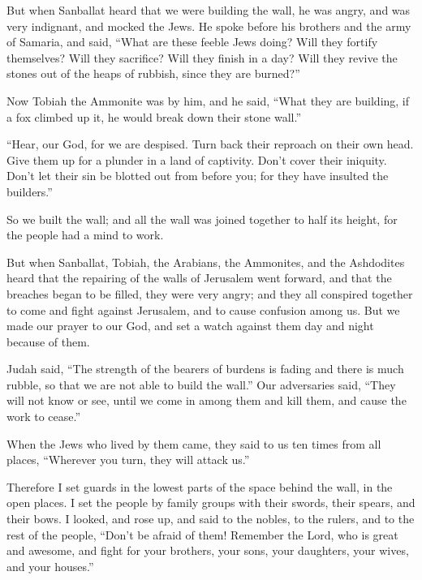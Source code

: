 \mychapter{} \myverse*{}But when Sanballat heard that we were building the wall, he was
angry, and was very indignant, and mocked the Jews.
\myverse{}He spoke before his brothers and the army of Samaria, and said, “What are these
feeble Jews doing? Will they fortify themselves? Will they sacrifice? Will they finish in a day? Will
they revive the stones out of the heaps of rubbish, since they are burned?”

\myverse{}Now Tobiah the Ammonite was by him, and he said, “What they are
building, if a fox climbed up it, he would break down their stone wall.”

\myverse{}“Hear, our God, for we are despised. Turn back their reproach on
their own head. Give them up for a plunder in a land of captivity.
\myverse{}Don’t cover their iniquity. Don’t let their sin be blotted out from before you;
for they have insulted the builders.”

\myverse{}So we built the wall; and all the wall was joined together to half
its height, for the people had a mind to work.

\myverse{}But when Sanballat, Tobiah, the Arabians, the Ammonites, and the
Ashdodites heard that the repairing of the walls of Jerusalem went forward, and that the breaches began
to be filled, they were very angry;
\myverse{}and they all conspired together to come and fight against Jerusalem, and to
cause confusion among us.
\myverse{}But we made our prayer to our God, and set a watch against them day and night
because of them.

\myverse{}Judah said, “The strength of the bearers of burdens is fading
and there is much rubble, so that we are not able to build the wall.”
\myverse{}Our adversaries said, “They will not know or see, until we come in among them
and kill them, and cause the work to cease.”

\myverse{}When the Jews who lived by them came, they said to us ten times
from all places, “Wherever you turn, they will attack us.”

\myverse{}Therefore I set guards in the lowest parts of the space behind
the wall, in the open places. I set the people by family groups with their swords, their spears, and their
bows.
\myverse{}I looked, and rose up, and said to the nobles, to the rulers, and to the rest
of the people, “Don’t be afraid of them! Remember the Lord, who is great and awesome, and fight for your
brothers, your sons, your daughters, your wives, and your houses.”

